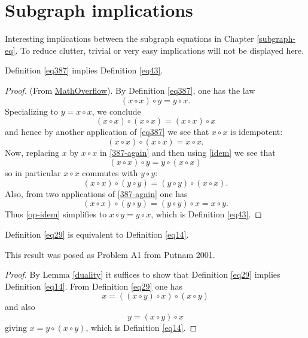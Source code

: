 \chapter{Subgraph implications}

Interesting implications between the subgraph equations in Chapter \ref{subgraph-eq}. To reduce clutter, trivial or very easy implications will not be displayed here.

\begin{theorem}[387 implies 43]\label{387_implies_43}\leanok  Definition \ref{eq387} implies Definition \ref{eq43}.
\end{theorem}

\begin{proof}\leanok (From \href{https://mathoverflow.net/a/450905/766}{MathOverflow}).
  By Definition \ref{eq387}, one has the law
\begin{equation}\label{387-again}
  (x \circ x) \circ y = y \circ x.
\end{equation}
Specializing to $y=x \circ x$, we conclude
$$(x \circ x) \circ (x \circ x) = (x \circ x) \circ x$$
and hence by another application of \eqref{eq387} we see that $x \circ x$ is idempotent:
\begin{equation}\label{idem}
  (x \circ x) \circ (x \circ x) = x \circ x.
\end{equation}
Now, replacing $x$ by $x \circ x$ in \eqref{387-again} and then using \eqref{idem} we see that
$$ (x \circ x) \circ y = y \circ (x \circ x)$$
so in particular $x \circ x$ commutes with $y \circ y$:
\begin{equation}\label{op-idem} (x \circ x) \circ (y \circ y) = (y \circ y) \circ (x \circ x).
\end{equation}
Also, from two applications of \eqref{387-again} one has
$$(x \circ x) \circ (y \circ y) = (y \circ y) \circ x = x \circ y.$$
Thus \eqref{op-idem} simplifies to $x \circ y = y \circ x$, which is Definition \ref{eq43}.
\end{proof}

\begin{theorem}[29 equivalent to 14]\label{29_equiv_14} \leanok  Definition \ref{eq29} is equivalent to Definition \ref{eq14}.
\end{theorem}

This result was posed as Problem A1 from Putnam 2001.

\begin{proof}\leanok{} By Lemma \ref{duality} it suffices to show that Definition \ref{eq29} implies Definition \ref{eq14}.  From Definition \ref{eq29} one has
  $$ x = ((x \circ y) \circ x) \circ (x \circ y)$$
  and also
  $$ y = (x \circ y) \circ x$$
  giving $x = y \circ (x \circ y)$, which is Definition \ref{eq14}.
\end{proof}


